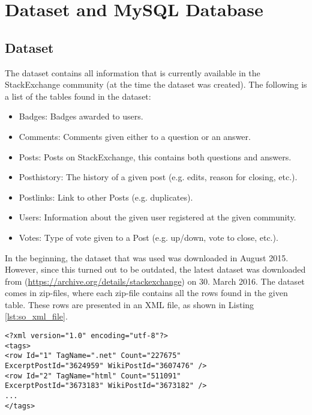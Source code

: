 \label{chap:chapter3}

\section{Dataset and MySQL Database}
\label{sec:dataset_db}

\subsection{Dataset}
The dataset contains all information that is currently available in the StackExchange community (at the time the dataset was created). 
The following is a list of the tables found in the dataset:
\begin{itemize}
	\item Badges: Badges awarded to users.
	\item Comments: Comments given either to a question or an answer.
	\item Posts: Posts on StackExchange, this contains both questions and answers.
	\item Posthistory: The history of a given post (e.g. edits, reason for closing, etc.).
	\item Postlinks: Link to other Posts (e.g. duplicates).
	\item Users: Information about the given user registered at the given community.
	\item Votes: Type of vote given to a Post (e.g. up/down, vote to close, etc.).
\end{itemize}
In the beginning, the dataset that was used was downloaded in August 2015. 
However, since this turned out to be outdated, the latest dataset was downloaded from (\url{https://archive.org/details/stackexchange}) on 30. March 2016. 
The dataset comes in zip-files, where each zip-file contains all the rows found in the given table. 
These rows are presented in an XML file, as shown in Listing \ref{lst:so_xml_file}.
\begin{lstlisting}[caption={Content in stackoverflow.com-Tags.xml}, label={lst:so_xml_file}] 
<?xml version="1.0" encoding="utf-8"?>
<tags>
<row Id="1" TagName=".net" Count="227675" 
ExcerptPostId="3624959" WikiPostId="3607476" />
<row Id="2" TagName="html" Count="511091" 
ExcerptPostId="3673183" WikiPostId="3673182" />
...
</tags>
\end{lstlisting}

